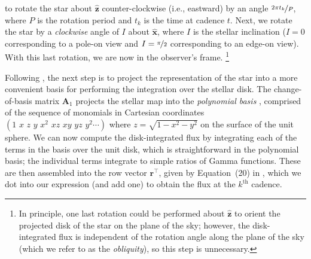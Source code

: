 \documentclass[modern]{aastex62}
\begin{document}
to rotate the star about $\hat{\mathbf{z}}$ counter-clockwise (i.e., eastward) by an angle
$\nicefrac{2\pi t_k}{P}$, where $P$ is the rotation period and $t_k$ is the
time at cadence $t$.
Next, we rotate the star by a \emph{clockwise} angle of $I$ about $\hat{\mathbf{x}}$,
where $I$ is the stellar inclination ($I = 0$ corresponding to a pole-on view and
$I = \nicefrac{\pi}{2}$ corresponding to an edge-on view). With this last rotation,
we are now in the observer's frame.%
\footnote{In principle, one last rotation could be performed about $\hat{\mathbf{z}}$
    to orient the projected disk of the star on the plane of the sky; however, the disk-integrated
    flux is independent of the rotation angle along the plane of the sky
    (which we refer to as the \emph{obliquity}), so this step is unnecessary.}

Following \citet{Luger2019}, the next step is to project the representation of
the star into a more convenient basis for performing the integration over the stellar
disk. The change-of-basis matrix $\mathbf{A}_1$ \citep[c.f. Appendix~B in][]{Luger2019}
projects the stellar map into the \emph{polynomial basis}
\citep[Equation~7 in][]{Luger2019}, comprised of the sequence of monomials in Cartesian
coordinates
$\left( 1 \,\, x \,\, z \,\, y \,\, x^2 \,\, xz \,\, xy \,\, yz \,\, y^2 \cdots \right)$
where $z = \sqrt{1 - x^2 - y^2}$ on the surface of the unit sphere. We
can now compute the disk-integrated flux by integrating each of the terms in the basis
over the unit disk, which is straightforward in the polynomial basis; the
individual terms integrate to simple ratios of Gamma functions. These are then
assembled into the row vector $\mathbf{r}^\top$, given by Equation~(20) in
\citet{Luger2019}, which we dot into our expression (and add one) to obtain the
flux at the $k^\mathrm{th}$ cadence.
\end{document}
